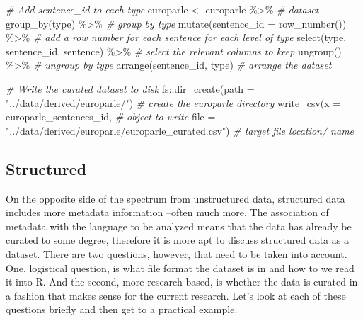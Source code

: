\documentclass[
]{article}
\newenvironment{Shaded}{\begin{snugshade}}{\end{snugshade}}
\newcommand{\AttributeTok}[1]{\textcolor[rgb]{0.77,0.63,0.00}{#1}}
\newcommand{\CommentTok}[1]{\textcolor[rgb]{0.56,0.35,0.01}{\textit{#1}}}
\newcommand{\FunctionTok}[1]{\textcolor[rgb]{0.00,0.00,0.00}{#1}}
\newcommand{\NormalTok}[1]{#1}
\newcommand{\OtherTok}[1]{\textcolor[rgb]{0.56,0.35,0.01}{#1}}
\newcommand{\SpecialCharTok}[1]{\textcolor[rgb]{0.00,0.00,0.00}{#1}}
\newcommand{\StringTok}[1]{\textcolor[rgb]{0.31,0.60,0.02}{#1}}
\begin{document}
\begin{Shaded}
\begin{Highlighting}[]
\CommentTok{\# Add \textasciigrave{}sentence\_id\textasciigrave{} to each \textasciigrave{}type\textasciigrave{}}
\NormalTok{europarle }\OtherTok{\textless{}{-}} 
\NormalTok{  europarle }\SpecialCharTok{\%\textgreater{}\%} \CommentTok{\# dataset}
  \FunctionTok{group\_by}\NormalTok{(type) }\SpecialCharTok{\%\textgreater{}\%} \CommentTok{\# group by type}
  \FunctionTok{mutate}\NormalTok{(}\AttributeTok{sentence\_id =} \FunctionTok{row\_number}\NormalTok{()) }\SpecialCharTok{\%\textgreater{}\%} \CommentTok{\# add a row number for each sentence for each level of type}
  \FunctionTok{select}\NormalTok{(type, sentence\_id, sentence) }\SpecialCharTok{\%\textgreater{}\%} \CommentTok{\# select the relevant columns to keep}
  \FunctionTok{ungroup}\NormalTok{() }\SpecialCharTok{\%\textgreater{}\%}  \CommentTok{\# ungroup by type}
  \FunctionTok{arrange}\NormalTok{(sentence\_id, type) }\CommentTok{\# arrange the dataset}

\CommentTok{\# Write the curated dataset to disk}
\NormalTok{fs}\SpecialCharTok{::}\FunctionTok{dir\_create}\NormalTok{(}\AttributeTok{path =} \StringTok{"../data/derived/europarle/"}\NormalTok{) }\CommentTok{\# create the europarle directory}
\FunctionTok{write\_csv}\NormalTok{(}\AttributeTok{x =}\NormalTok{ europarle\_sentences\_id, }\CommentTok{\# object to write}
          \AttributeTok{file =} \StringTok{"../data/derived/europarle/europarle\_curated.csv"}\NormalTok{) }\CommentTok{\# target file location/ name}
\end{Highlighting}
\end{Shaded}

\hypertarget{structured}{%
\subsection{Structured}\label{structured}}

On the opposite side of the spectrum from unstructured data, structured data includes more metadata information --often much more. The association of metadata with the language to be analyzed means that the data has already be curated to some degree, therefore it is more apt to discuss structured data as a dataset. There are two questions, however, that need to be taken into account. One, logistical question, is what file format the dataset is in and how to we read it into R. And the second, more research-based, is whether the data is curated in a fashion that makes sense for the current research. Let's look at each of these questions briefly and then get to a practical example.
\end{document}
